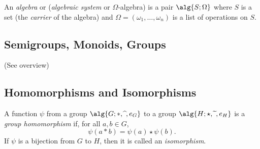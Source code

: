 \Def[Algebra] An \emph{algebra} or (\emph{algebraic system} or $\Omega$-algebra)
is a pair $\alg{S;\Omega}$ where $S$ is a set (the \emph{carrier} of the
algebra) and $\Omega=(\omega_1,\ldots,\omega_n)$ is a list of operations on $S$.

\begin{comment}
There are three levels of abstraction at which one can study algebras.
\begin{itemize}
  \item The \emph{concrete} level: One studies concrete structures and their
  properties.
  \item The \emph{axiomatic} level: One studies a certain class of algebras
  specified by a set of axioms. The axioms are seen as postulates assumed to be
  satisfied for all algebras under consideration. Equivalently, one considers
  all algebras satisfying these axioms, not necessarily with a concrete example
  in mind. Consequences derived from the axioms hold for all algebras in the
  general class of algebras satisfying the axioms.
  \item The \emph{universal} level: One studies algebras without specifying the
  aximos nor the type. For instances, subalgebra, isomorphism, and the direct
  product (see later) are universal algebraic concepts that apply to any
  algebra.
\end{itemize}

Usually, algebra is treated at the abstract axiomatic level, giving examples at
the concrete level. The universal level is considered less frequently.
\end{comment}

\subsection{Semigroups, Monoids, Groups}

(See overview)

\subsection{Homomorphisms and Isomorphisms}

\Def[Homomorphism] A function $\psi$ from a group $\alg{G;*,\widehat{ \ }, e_G}$
to a group $\alg{H;\star,\widetilde{\ }, e_H}$ is a \emph{group homomorphism}
if, for all $a,b\in G$,
\[
\psi(a*b)=\psi(a)\star\psi(b).
\]
\Def[Isomorphism] If $\psi$ is a bijection from $G$ to $H$, then it is called an
\emph{isomorphism}.

